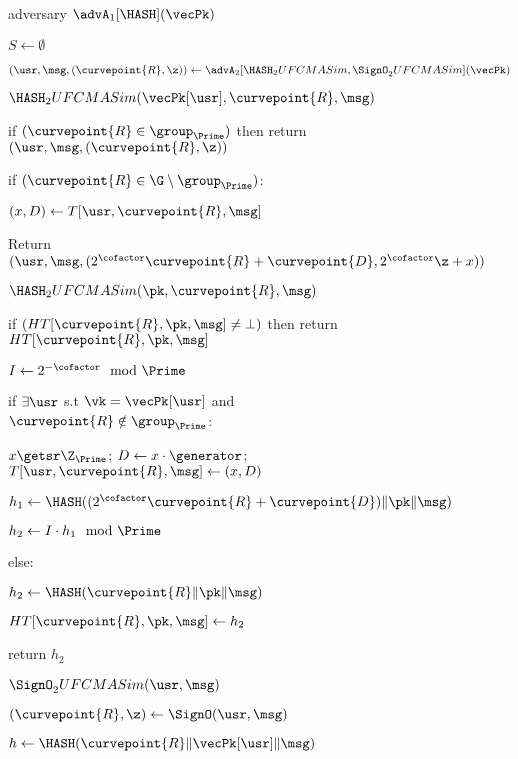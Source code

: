	
	\begin{figure}
		{	
			\begin{algorithm-initial}{adversary $\advA_1[\HASH](\vecPk)$}
				\item $S \gets \emptyset$
				\item $(\usr, \msg, (\curvepoint{R}, \z)) \gets \advA_2[\HASH_2UFCMASim, \SignO_2 UFCMASim](\vecPk)$
				\item $\HASH_2UFCMASim(\vecPk[\usr], \curvepoint{R},  \msg)$
				\item if $(\curvepoint{R} \in \group_{\Prime})$ then return $(\usr, \msg, (\curvepoint{R}, \z))$
				\item if $(\curvepoint{R} \in \G \setminus \group_{\Prime})$:
				\item \quad $(x, D) \gets T[\usr, \curvepoint{R}, \msg]$
				\item Return $(\usr, \msg, (2^\cofactor\curvepoint{R} + \curvepoint{D}, 2^\cofactor\z + x))$
			\end{algorithm-initial}  \vspace{2pt}
			\begin{algorithm-subsequent}{$\HASH_2UFCMASim(\pk, \curvepoint{R},  \msg)$}
				\item if $(HT[\curvepoint{R}, \pk, \msg] \neq \bot)$ then return $HT[\curvepoint{R}, \pk, \msg]$
				\item $I \gets 2^{-\cofactor} \mod \Prime$
				\item if $\exists \usr$ s.t $\vk = \vecPk[\usr]$ and $\curvepoint{R} \notin \group_{\Prime}$:
				\item \quad $x \getsr \Z_{\Prime}$; $D \gets x \cdot \generator$; $T[\usr, \curvepoint{R}, \msg] \gets (x, D)$
				\item \quad $h_1 \gets \HASH((2^\cofactor\curvepoint{R} + \curvepoint{D}) \|\pk\| \msg)$
				\item \quad $h_2 \gets I \cdot h_1 \mod \Prime$
				\item else:
				\item \quad $h_2 \gets \HASH(\curvepoint{R}\|\pk\| \msg)$
				\item $HT[\curvepoint{R}, \pk, \msg] \gets h_2$
				\item return $h_2$
			\end{algorithm-subsequent}  
			\begin{algorithm-subsequent}{$\SignO_2 UFCMASim(\usr, \msg)$}
				\item $(\curvepoint{R}, \z) \gets \SignO(\usr, \msg)$
				\item $h \gets \HASH(\curvepoint{R}\|\vecPk[\usr]\| \msg)$

\end{algorithm-subsequent}}
\end{figure}
